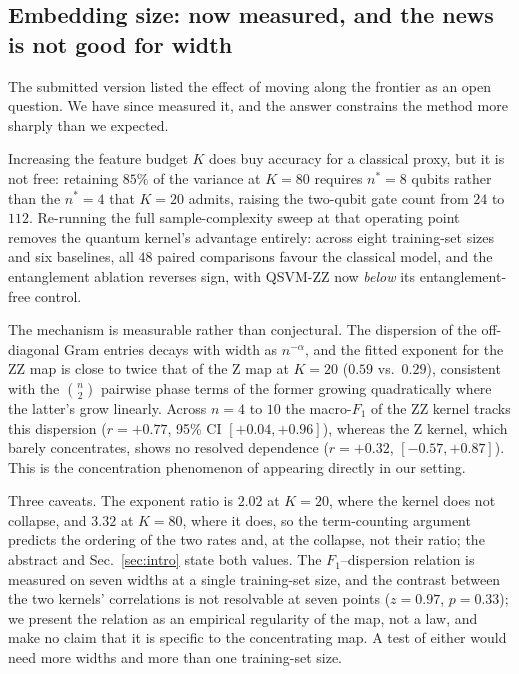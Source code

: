 \subsection{Embedding size: now measured, and the news is not good for width}
\begin{revbody}

The submitted version listed the effect of moving along the frontier as an open
question. We have since measured it, and the answer constrains the method more
sharply than we expected.

Increasing the feature budget $K$ does buy accuracy for a classical proxy, but
it is not free: retaining $85\%$ of the variance at $K=80$ requires $n^\ast=8$
qubits rather than the $n^\ast=4$ that $K=20$ admits, raising the two-qubit gate
count from $24$ to $112$. Re-running the full sample-complexity sweep at that
operating point removes the quantum kernel's advantage entirely: across eight
training-set sizes and six baselines, all $48$ paired comparisons favour the
classical model, and the entanglement ablation reverses sign, with QSVM-ZZ now
\emph{below} its entanglement-free control.

The mechanism is measurable rather than conjectural. The dispersion of the
off-diagonal Gram entries decays with width as $n^{-\alpha}$, and the fitted
exponent for the ZZ map is close to twice that of the Z map at $K=20$
($0.59$ vs.\ $0.29$), consistent with the $\binom{n}{2}$ pairwise phase terms of
the former growing quadratically where the latter's grow linearly. Across
$n=4$ to $10$ the macro-$F_1$ of the ZZ kernel tracks this dispersion
($r=+0.77$, 95\% CI $[+0.04,+0.96]$), whereas the Z kernel, which barely
concentrates, shows no resolved dependence ($r=+0.32$, $[-0.57,+0.87]$). This is
the concentration phenomenon of \cite{thanasilp2024} appearing directly in our
setting.

Three caveats. The exponent ratio is $2.02$ at $K=20$, where the kernel does not
collapse, and $3.32$ at $K=80$, where it does, so the term-counting argument
predicts the ordering of the two rates and, at the collapse, not their ratio;
the abstract and Sec.~\ref{sec:intro} state both values. The $F_1$--dispersion
relation is measured on seven widths at a single training-set size, and the
contrast between the two kernels' correlations is not resolvable at seven
points ($z=0.97$, $p=0.33$); we present the relation as an empirical regularity
of the \ZZ{} map, not a law, and make no claim that it is specific to the
concentrating map. A test of either would need more widths and more than one
training-set size.
\end{revbody}


